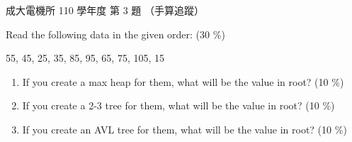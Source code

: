 \begin{pastexam}[label={px:ncku-110-ee-ds-03}]{成大電機所 110 學年度 第 3 題}
（手算追蹤）

Read the following data in the given order: \quad (30 \%)
\begin{center}55, 45, 25, 35, 85, 95, 65, 75, 105, 15\end{center}
\begin{enumerate}[label=(\alph*)]
\item If you create a max heap for them, what will be the value in root? \hfill (10 \%)
\item If you create a 2-3 tree for them, what will be the value in root? \hfill (10 \%)
\item If you create an AVL tree for them, what will be the value in root? \hfill (10 \%)
\end{enumerate}
\end{pastexam}

